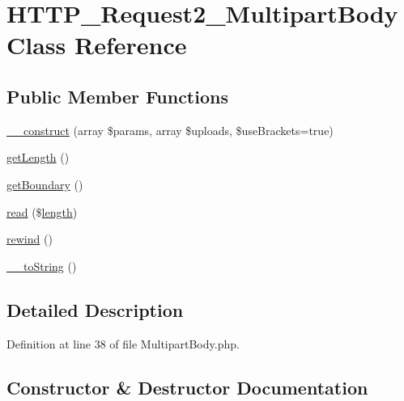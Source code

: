 \hypertarget{classHTTP__Request2__MultipartBody}{}\section{H\+T\+T\+P\+\_\+\+Request2\+\_\+\+Multipart\+Body Class Reference}
\label{classHTTP__Request2__MultipartBody}
\subsection*{Public Member Functions}
\begin{DoxyCompactItemize}
\item 
\hyperlink{classHTTP__Request2__MultipartBody_afcc06a1975350d5bf0a66b8756cedb47}{\+\_\+\+\_\+construct} (array \$params, array \$uploads, \$use\+Brackets=true)
\item 
\hyperlink{classHTTP__Request2__MultipartBody_ad363b71daa46b8fc283bbe35c0c822c8}{get\+Length} ()
\item 
\hyperlink{classHTTP__Request2__MultipartBody_a67b4cebe7c8e77040d0c8961aa2b9aad}{get\+Boundary} ()
\item 
\hyperlink{classHTTP__Request2__MultipartBody_aa392b34f91cbaf97962b7f77ea287cad}{read} (\$\hyperlink{xpresseditor_8min_8js_a8251a40bc2803d85bf8a918f1f288cce}{length})
\item 
\hyperlink{classHTTP__Request2__MultipartBody_af603c54ddf7736f0cbfcab11f64e089b}{rewind} ()
\item 
\hyperlink{classHTTP__Request2__MultipartBody_a06b941512f51155beacac6c34cc34826}{\+\_\+\+\_\+to\+String} ()
\end{DoxyCompactItemize}


\subsection{Detailed Description}


Definition at line 38 of file Multipart\+Body.\+php.



\subsection{Constructor \& Destructor Documentation}
